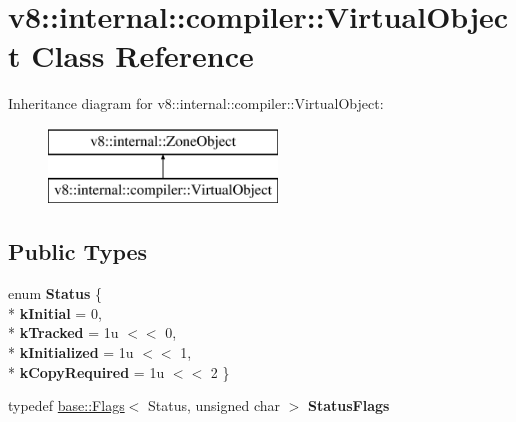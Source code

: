 \hypertarget{classv8_1_1internal_1_1compiler_1_1_virtual_object}{}\section{v8\+:\+:internal\+:\+:compiler\+:\+:Virtual\+Object Class Reference}
\label{classv8_1_1internal_1_1compiler_1_1_virtual_object}
Inheritance diagram for v8\+:\+:internal\+:\+:compiler\+:\+:Virtual\+Object\+:\begin{figure}[H]
\begin{center}
\leavevmode
\includegraphics[height=2.000000cm]{classv8_1_1internal_1_1compiler_1_1_virtual_object}
\end{center}
\end{figure}
\subsection*{Public Types}
\begin{DoxyCompactItemize}
\item 
enum {\bfseries Status} \{ \\*
{\bfseries k\+Initial} = 0, 
\\*
{\bfseries k\+Tracked} = 1u $<$$<$ 0, 
\\*
{\bfseries k\+Initialized} = 1u $<$$<$ 1, 
\\*
{\bfseries k\+Copy\+Required} = 1u $<$$<$ 2
 \}\hypertarget{classv8_1_1internal_1_1compiler_1_1_virtual_object_a91033725eb01f5cdc1aec335663bf259}{}\label{classv8_1_1internal_1_1compiler_1_1_virtual_object_a91033725eb01f5cdc1aec335663bf259}

\item 
typedef \hyperlink{classv8_1_1base_1_1_flags}{base\+::\+Flags}$<$ Status, unsigned char $>$ {\bfseries Status\+Flags}\hypertarget{classv8_1_1internal_1_1compiler_1_1_virtual_object_a3d28d89ed7bb9391038cf0c042fcbc3d}{}\label{classv8_1_1internal_1_1compiler_1_1_virtual_object_a3d28d89ed7bb9391038cf0c042fcbc3d}

\end{DoxyCompactItemize}
